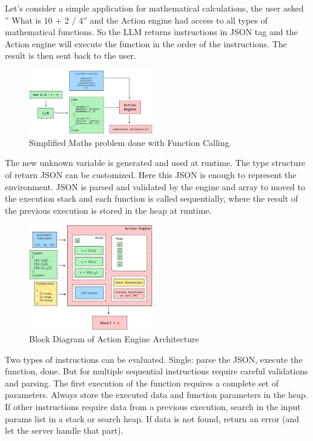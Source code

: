 \documentclass[conference]{IEEEtran}
\begin{document}
Let's consider a simple application for mathematical calculations, the user asked ” What is 10 + 2 / 4” and the Action engine had access to all types of mathematical functions. So the LLM returns instructions in JSON tag and the Action engine will execute the function in the order of the instructions. The result is then sent back to the user.


\begin{figure}[htbp]
    \centering
    \includegraphics[width=0.48\textwidth]{images/maths.png}
    \caption{Simplified Maths problem done with Function Calling.}
    \label{fig}
\end{figure}

The new unknown variable is generated and used at runtime. The type structure of return JSON can be customized. Here this JSON is enough to represent the environment. JSON is parsed and validated by the engine and array to moved to the execution stack and each function is called sequentially, where the result of the previous execution is stored in the heap at runtime.

\begin{figure}[htbp]
\centering
\includegraphics[width=0.48\textwidth]{images/action-engine.png}
\caption{Block Diagram of Action Engine Architecture}
\label{fig}
\end{figure}

Two types of instructions can be evaluated. Single: parse the JSON, execute the function, done. But for multiple sequential instructions require careful validations and parsing. The first execution of the function requires a complete set of parameters. Always store the executed data and function parameters in the heap. If other instructions require data from a previous execution, search in the input params list in a stack or search heap. If data is not found, return an error (and let the server handle that part). 
\end{document}
